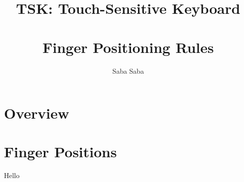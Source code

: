 \documentclass[12pt, letterpaper, titlepage]{article}
\author{Saba Saba}
\title{\textbf{TSK: Touch-Sensitive Keyboard} \\
\hrulefill \\
Finger Positioning Rules}
\begin{document}
\maketitle

\tableofcontents
\newpage
\listoffigures
\newpage

\section{Overview}

\section{Finger Positions}
Hello~\cite{hudson.misc}


\clearpage
{}
{}

\end{document}

